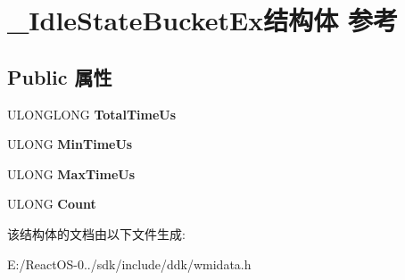 \hypertarget{struct___idle_state_bucket_ex}{}\section{\+\_\+\+Idle\+State\+Bucket\+Ex结构体 参考}
\label{struct___idle_state_bucket_ex}
\subsection*{Public 属性}
\begin{DoxyCompactItemize}
\item 
\mbox{\label{struct___idle_state_bucket_ex_a57e5585f0bb57575537ef1efc280748e}} 
U\+L\+O\+N\+G\+L\+O\+NG {\bfseries Total\+Time\+Us}
\item 
\mbox{\label{struct___idle_state_bucket_ex_a5e3c7c9c06017537da21e1be54ecf567}} 
U\+L\+O\+NG {\bfseries Min\+Time\+Us}
\item 
\mbox{\label{struct___idle_state_bucket_ex_a970d66c02d272ccdc4d1c23872ff73a0}} 
U\+L\+O\+NG {\bfseries Max\+Time\+Us}
\item 
\mbox{\label{struct___idle_state_bucket_ex_ab9e6a4cbf1bd3c2b07289c71022c0b8a}} 
U\+L\+O\+NG {\bfseries Count}
\end{DoxyCompactItemize}


该结构体的文档由以下文件生成\+:\begin{DoxyCompactItemize}
\item 
E\+:/\+React\+O\+S-\/0../sdk/include/ddk/wmidata.\+h\end{DoxyCompactItemize}
